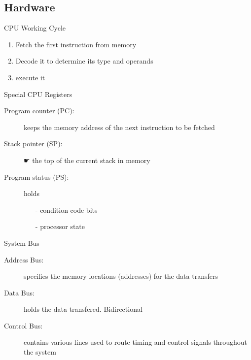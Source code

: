 \subsection{Hardware}
\label{sec:cpu}

\begin{frame}{CPU Working Cycle}
  \begin{center}
  \end{center}
  \begin{enumerate}
  \item Fetch the first instruction from memory
  \item Decode it to determine its type and operands
  \item execute it
  \end{enumerate}
  \begin{block}{Special CPU Registers}
    \begin{description}
    \item[Program counter (PC):] keeps the memory address of the next instruction to
      be fetched
    \item[Stack pointer (SP):] {\symbola ☛} the top of the current stack in memory
    \item[Program status (PS):] holds
      \begin{itemize}
      \item[-] condition code bits
      \item[-] processor state
      \end{itemize}
    \end{description}
  \end{block}
\end{frame}

\begin{frame}{System Bus}
  \begin{center}
  \end{center}
  \begin{description}
  \item[Address Bus:] specifies the memory locations (addresses) for the
    data transfers
  \item[Data Bus:] holds the data transfered. Bidirectional
  \item[Control Bus:] contains various lines used to route timing and
    control signals throughout the system
  \end{description}
\end{frame}

